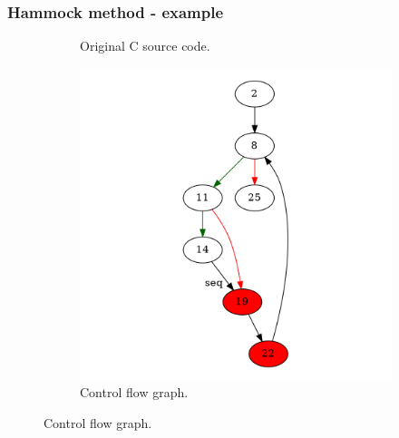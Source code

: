 \documentclass[aspectratio=1610]{beamer}
\begin{document}
\begin{frame}
	\frametitle{Hammock method - example}
	\begin{figure}[htbp]
		\centering
		\begin{subfigure}[b]{0.30\textwidth}
			\centering
			
			\caption{Original C source code.}
		\end{subfigure}
		\begin{subfigure}[b]{0.50\textwidth}
			\centering
			\includegraphics[height=0.6\paperheight]{inc/methods/hammock/example/without-break/main_0001a.png}
			\caption{Control flow graph.}
		\end{subfigure}
	\end{figure}
\end{frame}
\end{document}
